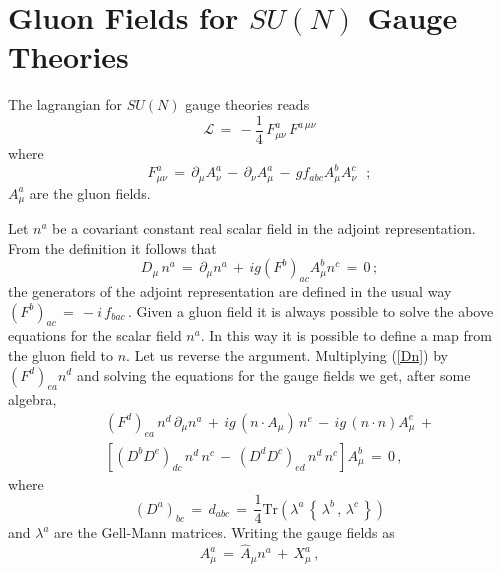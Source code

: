 \documentclass[a4paper,a4paper]{article}
\begin{document}
\section{Gluon Fields for $SU(N)$ Gauge Theories}

The lagrangian for $SU(N)$ gauge theories reads
\begin{equation}
 \mathcal{L} \, = \, - \frac{1}{4} \, F^a_{\mu\nu} \, F^{a \, \mu\nu}
\end{equation}
where
\begin{equation}
 F^a_{\mu\nu} \, = \, \partial_\mu A^a_\nu \, - \,
                      \partial_\nu A^a_\mu  \, - \,
                      g f_{abc} A^b_\mu A^c_\nu
 \mbox{ };
\end{equation}
$A^a_\mu$ are the gluon fields. 

Let $n^a$ be a covariant constant real scalar field in the adjoint 
representation. From the definition it follows that
\begin{equation}
 D_\mu \, n ^a \, = \, 
    \partial_\mu n^a \, + \, i g \left( F^b \right)_{ac} A^b_\mu n^c
  \, = \, 0 \, ; \label{Dn}
\end{equation}
the generators of the adjoint representation are defined in the
usual way $\left( F^b \right)_{ac} \, = \, -i \, f_{bac} \,$. 
Given a gluon field it is always possible to solve the above equations for 
the scalar field $n^a$. In this way it is possible to define a map from the 
gluon field to $n$. Let us reverse the argument. Multiplying (\ref{Dn}) by 
$\left( F^d \right)_{ea} n^d$ and solving the equations for the gauge 
fields we get, after some algebra,
\begin{eqnarray}
 & &   \left( F^d \right)_{ea} \, n^d \, \partial_\mu n^a \, + \,
 i g \, ( n \cdot A_\mu ) \, n^e \, - \,
  i g \, ( n \cdot n ) A^e_\mu \, + \,
\nonumber \\
 & &
 \left[  \left( D^b D^e \right)_{dc} \, n^d \, n^c \, - \,
         \left( D^d D^c \right)_{ed} \, n^d \, n^c \right] A^b_\mu
 \, = \, 0 \, ,
 \label{eqn1}
\end{eqnarray}
where
\begin{equation}
\left( D^a \right)_{bc} \, = \, d_{abc} \, = \,
   \frac{1}{4}
   \mbox{Tr} \left( \lambda^a \, \left\{ \,\lambda^b \, , \,
                                           \lambda^c \, \right\}
             \right)
\end{equation}
and $\lambda^a$ are the Gell-Mann matrices.
Writing the gauge fields as
\begin{equation}
   A^a_\mu \, = \, \hat{A}_\mu n^a \, + \, X^a_\mu \, ,
\end{equation}
\end{document}
